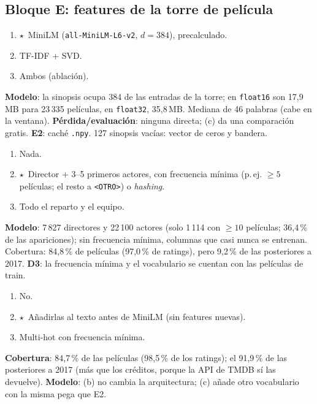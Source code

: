 \documentclass[a4paper,11pt]{article}
\newcommand{\rec}{\ensuremath{\star}}
\begin{document}
\subsection*{\large Bloque E: features de la torre de película}

\begin{enumerate}[label=\alph*)]
  \item \rec\ MiniLM (\texttt{all-MiniLM-L6-v2}, $d=384$), precalculado.
  \item TF-IDF + SVD.
  \item Ambos (ablación).
\end{enumerate}
\textbf{Modelo}: la sinopsis ocupa 384 de las entradas de la torre; en \texttt{float16} son 17,9\,MB para 23\,335 películas, en \texttt{float32}, 35,8\,MB. Mediana de 46
palabras (cabe en la ventana). \textbf{Pérdida/evaluación}: ninguna directa; (c) da una comparación gratis. \textbf{E2}: caché \texttt{.npy}. 127 sinopsis vacías: vector de ceros y bandera.

\begin{enumerate}[label=\alph*)]
  \item Nada.
  \item \rec\ Director + 3--5 primeros actores, con frecuencia mínima (p.\,ej. $\ge5$ películas; el resto a \texttt{<OTRO>}) o \emph{hashing}.
  \item Todo el reparto y el equipo.
\end{enumerate}
\textbf{Modelo}: 7\,827 directores y 22\,100 actores (solo 1\,114 con $\ge10$ películas; 36,4\,\% de las apariciones); sin frecuencia mínima, columnas que casi nunca se entrenan. Cobertura: 84,8\,\% de
películas (97,0\,\% de ratings), pero 9,2\,\% de las posteriores a 2017. \textbf{D3}: la frecuencia mínima y el vocabulario se cuentan con las películas de train.

\begin{enumerate}[label=\alph*)]
  \item No.
  \item \rec\ Añadirlas al texto antes de MiniLM (sin features nuevas).
  \item Multi-hot con frecuencia mínima.
\end{enumerate}
\textbf{Cobertura}: 84,7\,\% de las películas (98,5\,\% de los ratings); el 91,9\,\% de las posteriores a 2017 (más que los créditos, porque la API de TMDB sí las devuelve).
\textbf{Modelo}: (b) no cambia la arquitectura; (c) añade otro vocabulario con la misma pega que E2.
\afecta{---}
\end{document}
